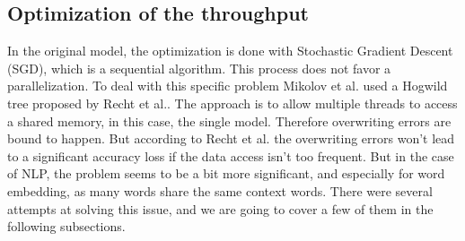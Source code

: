 \subsection{Optimization of the throughput}
In the original model, the optimization is done with Stochastic Gradient Descent (SGD), which is a sequential algorithm. This process does not favor a parallelization. To deal with this specific problem Mikolov et al.\cite{mikolov2} used a Hogwild tree proposed by Recht et al.\cite{hogwild}. The approach is to allow multiple threads to access a shared memory, in this case, the single model. Therefore overwriting errors are bound to happen. But according to Recht et al.\cite{hogwild} the overwriting errors won't lead to a significant accuracy loss if the data access isn't too frequent. But in the case of NLP, the problem seems to be a bit more significant, and especially for word embedding, as many words share the same context words. There were several attempts at solving this issue, and we are going to cover a few of them in the following subsections. 

